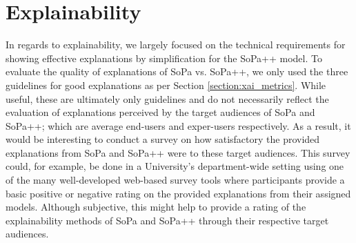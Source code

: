 \section{Explainability}

In regards to explainability, we largely focused on the technical requirements
for showing effective explanations by simplification for the SoPa++ model. To
evaluate the quality of explanations of SoPa vs. SoPa++, we only used the three
guidelines for good explanations as per Section \ref{section:xai_metrics}. While
useful, these are ultimately only guidelines and do not necessarily reflect the
evaluation of explanations perceived by the target audiences of SoPa and SoPa++;
which are average end-users and exper-users respectively. As a result, it would
be interesting to conduct a survey on how satisfactory the provided explanations
from SoPa and SoPa++ were to these target audiences. This survey could, for
example, be done in a University's department-wide setting using one of the many
well-developed web-based survey tools where participants provide a basic
positive or negative rating on the provided explanations from their assigned
models. Although subjective, this might help to provide a rating of the
explainability methods of SoPa and SoPa++ through their respective target
audiences.

